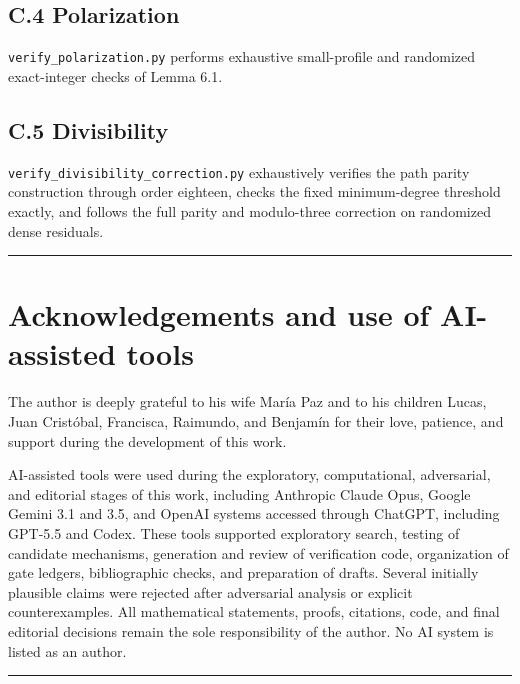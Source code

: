 \documentclass[11pt,a4paper]{article}
\begin{document}
\subsection{C.4 Polarization}\label{c.4-polarization}

\texttt{verify\_polarization.py} performs exhaustive small-profile and randomized exact-integer checks of Lemma 6.1.

\subsection{C.5 Divisibility}\label{c.5-divisibility}

\texttt{verify\_divisibility\_correction.py} exhaustively verifies the path parity construction through order eighteen, checks the fixed minimum-degree threshold exactly, and follows the full parity and modulo-three correction on randomized dense residuals.

\begin{center}\rule{0.5\linewidth}{0.5pt}\end{center}

\section{Acknowledgements and use of AI-assisted tools}\label{acknowledgements-and-use-of-ai-assisted-tools}

The author is deeply grateful to his wife María Paz and to his children Lucas, Juan Cristóbal, Francisca, Raimundo, and Benjamín for their love, patience, and support during the development of this work.

AI-assisted tools were used during the exploratory, computational, adversarial, and editorial stages of this work, including Anthropic Claude Opus, Google Gemini 3.1 and 3.5, and OpenAI systems accessed through ChatGPT, including GPT-5.5 and Codex. These tools supported exploratory search, testing of candidate mechanisms, generation and review of verification code, organization of gate ledgers, bibliographic checks, and preparation of drafts. Several initially plausible claims were rejected after adversarial analysis or explicit counterexamples. All mathematical statements, proofs, citations, code, and final editorial decisions remain the sole responsibility of the author. No AI system is listed as an author.

\begin{center}\rule{0.5\linewidth}{0.5pt}\end{center}
\end{document}
